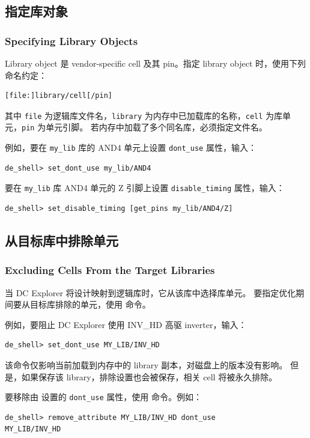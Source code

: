 \subsection{指定库对象}
\subsubsection*{Specifying Library Objects}

Library object 是 vendor-specific cell 及其 pin。指定 library object 时，使用下列命名约定：
\begin{lstlisting}
[file:]library/cell[/pin]
\end{lstlisting}
其中 \texttt{file} 为逻辑库文件名，\texttt{library} 为内存中已加载库的名称，\texttt{cell} 为库单元，\texttt{pin} 为单元引脚。
若内存中加载了多个同名库，必须指定文件名。

例如，要在 \texttt{my\_lib} 库的 AND4 单元上设置 \texttt{dont\_use} 属性，输入：
\begin{lstlisting}
de_shell> set_dont_use my_lib/AND4
\end{lstlisting}

要在 \texttt{my\_lib} 库 AND4 单元的 Z 引脚上设置 \texttt{disable\_timing} 属性，输入：
\begin{lstlisting}
de_shell> set_disable_timing [get_pins my_lib/AND4/Z]
\end{lstlisting}

\subsection{从目标库中排除单元}
\subsubsection*{Excluding Cells From the Target Libraries}

当 DC Explorer 将设计映射到逻辑库时，它从该库中选择库单元。
要指定优化期间要从目标库排除的单元，使用  命令。

例如，要阻止 DC Explorer 使用 INV\_HD 高驱 inverter，输入：
\begin{lstlisting}
de_shell> set_dont_use MY_LIB/INV_HD
\end{lstlisting}
该命令仅影响当前加载到内存中的 library 副本，对磁盘上的版本没有影响。
但是，如果保存该 library，排除设置也会被保存，相关 cell 将被永久排除。

要移除由  设置的 \texttt{dont\_use} 属性，使用  命令。例如：
\begin{lstlisting}
de_shell> remove_attribute MY_LIB/INV_HD dont_use
MY_LIB/INV_HD
\end{lstlisting}

